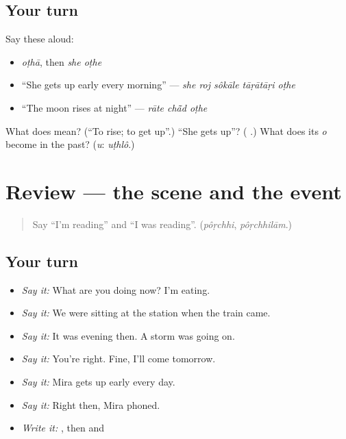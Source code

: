 \subsection*{Your turn}
Say these aloud:

\begin{itemize}
\raggedright
  \item \emph{oṭhā}, then \emph{she oṭhe}
  \item \textquotedblleft{}She gets up early every morning\textquotedblright{} — \emph{she roj sôkāle tāṛātāṛi oṭhe}
  \item \textquotedblleft{}The moon rises at night\textquotedblright{} — \emph{rāte chā̃d oṭhe}
\end{itemize}

\begin{tcolorbox}[breakable,colback=teal!4,colframe=teal!35!black,title={Before you move on}]
What does \textbf{} mean? (\textquotedblleft{}To rise; to get up\textquotedblright{}.) \textquotedblleft{}She gets up\textquotedblright{}? (\textbf{ }.) What does its \emph{o} become in the past? (\emph{u}: \emph{uṭhlô}.)
\end{tcolorbox}
\section[(review)]{Review — the scene and the event}

\label{lesson:BN-R266-the-scene}



\begin{quote}
Say \textquotedblleft{}I'm reading\textquotedblright{} and \textquotedblleft{}I was reading\textquotedblright{}. (\emph{pôṛchhi}, \emph{pôṛchhilām}.)
\end{quote}

\subsection*{Your turn}
\begin{itemize}
\raggedright
  \item \emph{Say it:} What are you doing now? I'm eating.
  \item \emph{Say it:} We were sitting at the station when the train came.
  \item \emph{Say it:} It was evening then. A storm was going on.
  \item \emph{Say it:} You're right. Fine, I'll come tomorrow.
  \item \emph{Say it:} Mira gets up early every day.
  \item \emph{Say it:} Right then, Mira phoned.
  \item \emph{Write it:} \textbf{}, then  and 
\end{itemize}

